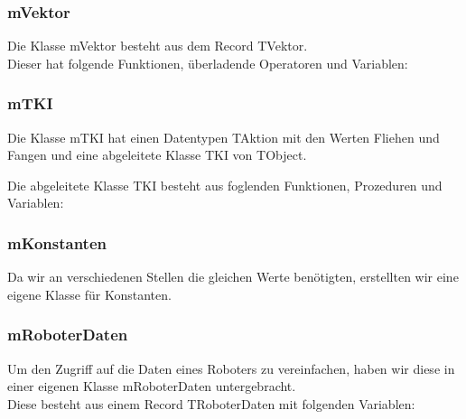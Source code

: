 \subsubsection{mVektor}
Die Klasse mVektor besteht aus dem Record TVektor.
\\
Dieser hat folgende Funktionen, überladende Operatoren und Variablen:


\subsubsection{mTKI}
Die Klasse mTKI hat einen Datentypen TAktion mit den Werten Fliehen und Fangen und eine abgeleitete Klasse TKI von TObject.

Die abgeleitete Klasse TKI besteht aus foglenden Funktionen, Prozeduren und Variablen:\\


\subsubsection{mKonstanten}
Da wir an verschiedenen Stellen die gleichen Werte benötigten, erstellten wir eine eigene Klasse für Konstanten.


\subsubsection{mRoboterDaten}
Um den Zugriff auf die Daten eines Roboters zu vereinfachen, haben wir diese in einer eigenen Klasse mRoboterDaten untergebracht.
\\
Diese besteht aus einem Record TRoboterDaten mit folgenden Variablen:



